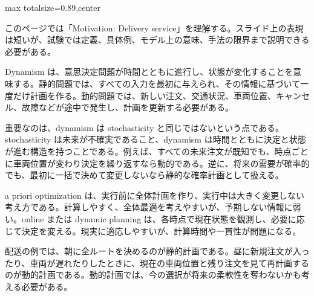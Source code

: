 \begin{minipage}[t]{0.58\textwidth}
\begin{adjustbox}{max totalsize={\textwidth}{0.89\textheight},center}
\begin{minipage}{\textwidth}\scriptsize
{}このページでは「Motivation: Delivery service」を理解する。スライド上の表現は短いが、試験では定義、具体例、モデル上の意味、手法の限界まで説明できる必要がある。\par
Dynamism は、意思決定問題が時間とともに進行し、状態が変化することを意味する。静的問題では、すべての入力を最初に与えられ、その情報に基づいて一度だけ計画を作る。動的問題では、新しい注文、交通状況、車両位置、キャンセル、故障などが途中で発生し、計画を更新する必要がある。\par
重要なのは、dynamism は stochasticity と同じではないという点である。stochasticity は未来が不確実であること、dynamism は時間とともに決定と状態が進む構造を持つことである。例えば、すべての未来注文が既知でも、時点ごとに車両位置が変わり決定を繰り返すなら動的である。逆に、将来の需要が確率的でも、最初に一括で決めて変更しないなら静的な確率計画として扱える。\par
a priori optimization は、実行前に全体計画を作り、実行中は大きく変更しない考え方である。計算しやすく、全体最適を考えやすいが、予期しない情報に弱い。online または dynamic planning は、各時点で現在状態を観測し、必要に応じて決定を変える。現実に適応しやすいが、計算時間や一貫性が問題になる。\par
配送の例では、朝に全ルートを決めるのが静的計画である。昼に新規注文が入ったり、車両が遅れたりしたときに、現在の車両位置と残り注文を見て再計画するのが動的計画である。動的計画では、今の選択が将来の柔軟性を奪わないかも考える必要がある。\par

\end{minipage}
\end{adjustbox}
\end{minipage}
